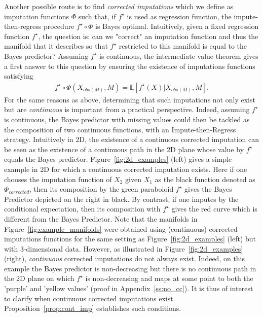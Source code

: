 \documentclass{article}
\newcommand{\E}{\mathbb{E}}
\newcommand{\sqb}[1]{\left[#1\right]}
\theoremstyle{plain}
\begin{document}
Another possible route is to find \emph{corrected imputations} which we
define as imputation functions $\Phi$ such that, if $f^\star$ is used as
regression function, the impute-then-regress procedure $f^\star \circ
\Phi$ is Bayes optimal. Intuitively, given a
fixed regression function $f^\star$, the question is: can we "correct" an
imputation function and thus the manifold that it describes so that
$f^\star$ restricted to this manifold is equal to the Bayes
predictor?
Assuming $f^\star$ is continuous, the intermediate value theorem gives a first answer to this question by ensuring the existence of imputations functions satisfying 
\begin{align*}
f^\star \circ
\Phi (X_{obs(M)}, M) = \E \sqb{f^\star(X) | X_{obs(M)}, M}.
\end{align*}
For the same reasons as above, determining that such imputations not only exist but are \emph{continuous} is important from a practical perspective.  Indeed, assuming $f^\star$ is continuous, the Bayes predictor with missing values could then be tackled as the composition of two continuous functions, with an Impute-then-Regress strategy. Intuitively in 2D, the existence of a continuous corrected imputation can be seen as the existence of a continuous path in the 2D plane whose value by $f^\star$ equals the Bayes predictor. Figure~\ref{fig:2d_examples} (left) gives a simple example in 2D for which a continuous corrected imputation exists. Here if one chooses the imputation function of $X_2$ given $X_1$ as the black function denoted as $\Phi_{corrected}$, then its composition by the green paraboloid $f^\star$ gives the Bayes Predictor depicted on the right in black. By contrast, if one imputes by the conditional expectation, then its composition with $f^\star$ gives the red curve which is different from the Bayes Predictor. Note that the manifolds in Figure~\ref{fig:example_manifolds} were obtained using (continuous) corrected imputations functions for the same setting as Figure~\ref{fig:2d_examples} (left) but with 3-dimensional data. However, as illustrated in Figure~\ref{fig:2d_examples} (right), \emph{continuous} corrected imputations do not always exist. Indeed, on this example the Bayes predictor is non-decreasing but there is no continuous path in the 2D plane on which $f^\star$ is non-decreasing and maps at some point to both the 'purple' and 'yellow values' (proof in Appendix~\ref{ss:no_cc}). It is thus of interest to clarify when continuous corrected imputations exist. Proposition~\ref{prop:cont_imp} establishes such conditions.
\end{document}
